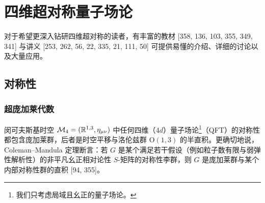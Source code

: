 
\chapter{四维超对称量子场论}


对于希望更深入钻研四维超对称的读者，有丰富的教材 [358, 136, 103, 355, 349, 341] 与讲义 [253, 262, 56, 22, 335, 21, 111, 50] 可提供易懂的介绍、详细的讨论以及大量应用。

\section{对称性}

\subsection{超庞加莱代数}

闵可夫斯基时空 $\mathcal{M}_4=(\mathbb{R}^{1,3},\eta_{\mu\nu})$ 中任何四维（$4d$）量子场论\footnote{我们只考虑局域且幺正的量子场论。}（QFT）的对称性都包含庞加莱群，后者是时空平移与洛伦兹群 $\mathrm{O}(1,3)$ 的半直积。更确切地说，Coleman–Mandula 定理断言：若 $G$ 是某个满足若干假设（例如粒子数有限与弱弹性解析性）的非平凡幺正相对论性 $S$-矩阵的对称性李群，则 $G$ 是庞加莱群与某个内部对称性群的直积 [94, 355]。

